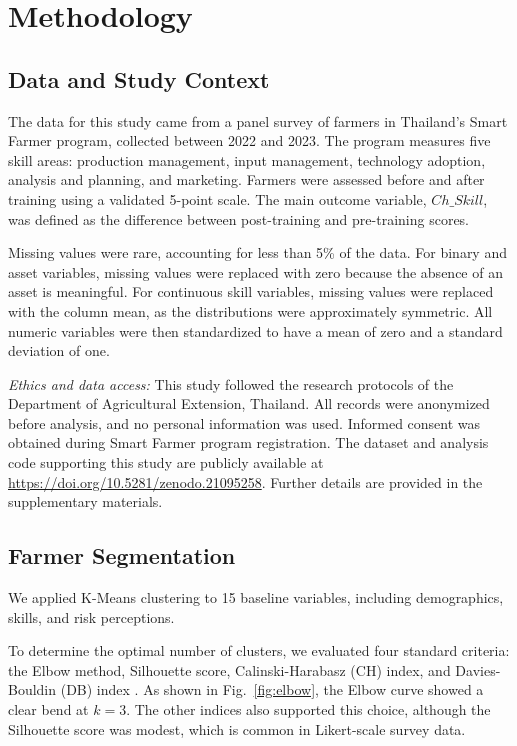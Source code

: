 \documentclass[fleqn,10pt,lineno]{wlpeerj}
\begin{document}
\section{Methodology}

\subsection{Data and Study Context}
The data for this study came from a panel survey of farmers in Thailand's Smart Farmer program, collected between 2022 and 2023. The program measures five skill areas: production management, input management, technology adoption, analysis and planning, and marketing. Farmers were assessed before and after training using a validated 5-point scale. The main outcome variable, $Ch\_Skill$, was defined as the difference between post-training and pre-training scores.

Missing values were rare, accounting for less than 5\% of the data. For binary and asset variables, missing values were replaced with zero because the absence of an asset is meaningful. For continuous skill variables, missing values were replaced with the column mean, as the distributions were approximately symmetric. All numeric variables were then standardized to have a mean of zero and a standard deviation of one.

\textit{Ethics and data access:} This study followed the research protocols of the Department of Agricultural Extension, Thailand. All records were anonymized before analysis, and no personal information was used. Informed consent was obtained during Smart Farmer program registration. The dataset and analysis code supporting this study are publicly available at \url{https://doi.org/10.5281/zenodo.21095258}. Further details are provided in the supplementary materials.

\subsection{Farmer Segmentation}
We applied K-Means clustering \citep{macqueen1967} to 15 baseline variables, including demographics, skills, and risk perceptions.

To determine the optimal number of clusters, we evaluated four standard criteria: the Elbow method, Silhouette score, Calinski-Harabasz (CH) index, and Davies-Bouldin (DB) index \citep{rouseeuw1987}. As shown in Fig.~\ref{fig:elbow}, the Elbow curve showed a clear bend at $k = 3$. The other indices also supported this choice, although the Silhouette score was modest, which is common in Likert-scale survey data.
\end{document}
